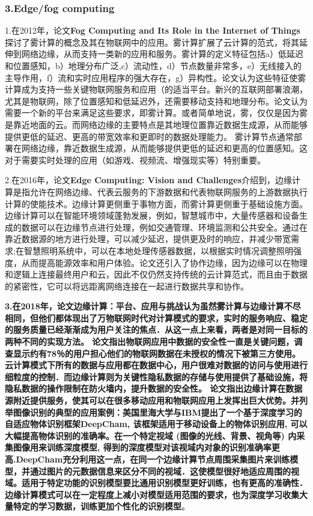 \documentclass[a4paper,twoside]{scrbook}
\begin{document}
\subsubsection{3.Edge/fog computing}
1.在2012年，论文\textbf{Fog Computing and Its Role in the Internet of Things}探讨了雾计算的概念及其在物联网中的应用。雾计算扩展了云计算的范式，将其延伸到网络边缘，从而支持一类新的应用和服务。雾计算的定义特征包括a）低延迟和位置感知，b）地理分布广泛,c）流动性，d）节点数量非常多，e）无线接入的主导作用，f）流和实时应用程序的强大存在，g）异构性。论文认为这些特征使雾计算成为支持一些关键物联网服务和应用（的适当平台。新兴的互联网部署浪潮，尤其是物联网，除了位置感知和低延迟外，还需要移动支持和地理分布。论文认为需要一个新的平台来满足这些要求，即雾计算。或者简单地说，雾，仅仅是因为雾是靠近地面的云。而网络边缘的主要特点是其地理位置靠近数据生成源，从而能够提供更低的延迟、更高的带宽效率和更即时的数据处理能力。
雾计算节点通常部署在网络边缘，靠近数据生成源，从而能够提供更低的延迟和更高的位置感知。这对于需要实时处理的应用（如游戏、视频流、增强现实等）特别重要。

2.在2016年，论文\textbf{Edge Computing: Vision and Challenges}介绍到，边缘计算是指允许在网络边缘、代表云服务的下游数据和代表物联网服务的上游数据执行计算的使能技术。边缘计算更侧重于事物方面，而雾计算更侧重于基础设施方面。边缘计算可以在智能环境领域蓬勃发展，例如，智慧城市中，大量传感器和设备生成的数据可以在边缘节点进行处理，例如交通管理、环境监测和公共安全。通过在靠近数据源的地方进行处理，可以减少延迟，提供更及时的响应，并减少带宽需求;在智慧照明系统中，可以在本地处理传感器数据，以根据实时情况调整照明强度，从而提高能源效率和用户体验。论文还引入了协作边缘，因为边缘可以在物理和逻辑上连接最终用户和云，因此不仅仍然支持传统的云计算范式，而且由于数据的紧密性，它可以将远距离网络连接在一起进行数据共享和协作。

\textbf{3.在2018年，论文\textbf{边缘计算：平台、应用与挑战}认为虽然雾计算与边缘计算不尽相同，但他们都体现出了万物联网时代对计算模式的要求，实时的服务响应、稳定的服务质量已经渐渐成为用户关注的焦点．从这一点上来看，两者是对同一目标的两种不同的实现方法。
论文指出物联网应用中数据的安全性一直是关键问题，调查显示约有78％的用户担心他们的物联网数据在未授权的情况下被第三方使用。云计算模式下所有的数据与应用都在数据中心，用户很难对数据的访问与使用进行细粒度的控制．而边缘计算则为关键性隐私数据的存储与使用提供了基础设施，将隐私数据的操作限制在防火墙内，提升数据的安全性。
论文指出边缘计算在数据源附近提供服务，使其可以在很多移动应用和物联网应用上发挥出巨大优势。并列举图像识别的典型的应用案例：美国里海大学与IBM提出了一个基于深度学习的自适应物体识别框架DeepCham, 该框架适用于移动设备上的物体识别应用, 可以大幅提高物体识别的准确率。在一个特定视域 (图像的光线、背景、视角等) 内采集图像用来训练深度模型, 得到的深度模型对该视域内对象的识别准确率更高.DeepCham充分利用这一点，在同一个边缘计算节点周围采集图片来训练模型，并通过图片的元数据信息来区分不同的视域．这使模型很好地适应周围的视域。适用于特定功能的识别模型要比通用识别模型更好训练，也有更高的准确性．边缘计算模式可以在一定程度上减小对模型适用范围的要求，也为深度学习收集大量特定的学习数据，训练更加个性化的识别模型}。
\end{document}

